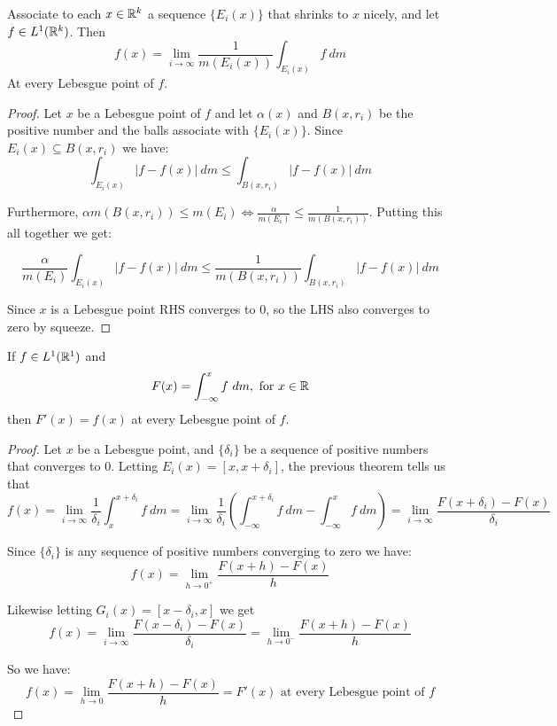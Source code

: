     \begin{theorem}
        Associate to each $x\in \mathbb{R}^k$ a sequence $\{E_i(x)\}$ that shrinks to $x$ nicely, and let $f\in L^1(\mathbb{R}^k)$. Then \[f(x) = \lim_{i\rightarrow \infty}\frac{1}{m(E_i(x))}\int_{E_i(x)} f~dm \]
        At every Lebesgue point of $f$.

        \begin{proof}
            Let $x$ be a Lebesgue point of $f$ and let $\alpha(x)$ and $B(x,r_i)$ be the positive number and the balls associate with $\{E_i(x)\}$. Since $E_i(x)\subseteq B(x,r_i)$ we have:
            \[\int_{E_i(x)}|f-f(x)|~dm \leq \int_{B(x,r_i)}|f-f(x)|~dm \]

            Furthermore, $\alpha m(B(x,r_i))\leq m(E_i) \iff \frac{\alpha}{m(E_i)}\leq \frac{1}{m(B(x,r_i))}$. Putting this all together we get:

            \[\frac{\alpha}{m(E_i)}\int_{E_i(x)}|f-f(x)|~dm \leq \frac{1}{m(B(x,r_i))}\int_{B(x,r_i)}|f-f(x)|~dm\]

            Since $x$ is a Lebesgue point RHS converges to $0$, so the LHS also converges to zero by squeeze.
        \end{proof}
    \end{theorem}

    \begin{corollary}\label{7.11}
        If $f\in L^1(\mathbb{R}^1)$ and \[F(x) = \int_{-\infty}^x f~dm, \text{ for }x\in \mathbb{R}\]
        then $F'(x) = f(x)$ at every Lebesgue point of $f$.

        \begin{proof}
            Let $x$ be a Lebesgue point, and $\{\delta_i\}$ be a sequence of positive numbers that converges to $0$. Letting $E_i(x) = [x,x+\delta_i]$, the previous theorem tells us that 
            \[f(x) = \lim_{i\rightarrow\infty} \frac{1}{\delta_i}\int_{x}^{x+\delta_i}f~dm = \lim_{i\rightarrow\infty}\frac{1}{\delta_i}(\int_{-\infty}^{x+\delta_i} f~dm - \int_{-\infty}^x f~dm) = \lim_{i\rightarrow\infty}\frac{F(x+\delta_i) - F(x)}{\delta_i} \]

            Since $\{\delta_i\}$ is any sequence of positive numbers converging to zero we have:\[f(x) = \lim_{h\rightarrow 0^+}\frac{F(x+h) - F(x)}{h}\]
            
            Likewise letting $G_i(x) = [x-\delta_i,x]$ we get \[f(x) = \lim_{i\rightarrow\infty}\frac{F(x-\delta_i) - F(x)}{\delta_i} = \lim_{h\rightarrow 0^-}\frac{F(x+h) - F(x)}{h} \]
        

            So we have:\[f(x) = \lim_{h\rightarrow 0}\frac{F(x+h) - F(x)}{h} = F'(x) \text{ at every Lebesgue point of }f\]
        \end{proof}
    \end{corollary}

